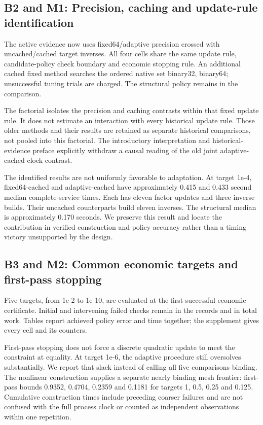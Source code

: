 \documentclass[
  11pt,
]{article}
\begin{document}
\hypertarget{b2-and-m1-precision-caching-and-update-rule-identification}{%
\subsection{B2 and M1: Precision, caching and update-rule
identification}\label{b2-and-m1-precision-caching-and-update-rule-identification}}

The active evidence now uses fixed64/adaptive precision crossed with
uncached/cached target inverses. All four cells share the same update
rule, candidate-policy check boundary and economic stopping rule. An
additional cached fixed method searches the ordered native set binary32,
binary64; unsuccessful tuning trials are charged. The structural policy
remains in the comparison.

The factorial isolates the precision and caching contrasts within that
fixed update rule. It does not estimate an interaction with every
historical update rule. Those older methods and their results are
retained as separate historical comparisons, not pooled into this
factorial. The introductory interpretation and historical-evidence
preface explicitly withdraw a causal reading of the old joint
adaptive-cached clock contrast.

The identified results are not uniformly favorable to adaptation. At
target 1e-4, fixed64-cached and adaptive-cached have approximately 0.415
and 0.433 second median complete-service times. Each has eleven factor
updates and three inverse builds. Their uncached counterparts build
eleven inverses. The structural median is approximately 0.170 seconds.
We preserve this result and locate the contribution in verified
construction and policy accuracy rather than a timing victory
unsupported by the design.

\hypertarget{b3-and-m2-common-economic-targets-and-first-pass-stopping}{%
\subsection{B3 and M2: Common economic targets and first-pass
stopping}\label{b3-and-m2-common-economic-targets-and-first-pass-stopping}}

Five targets, from 1e-2 to 1e-10, are evaluated at the first successful
economic certificate. Initial and intervening failed checks remain in
the records and in total work. Tables report achieved policy error and
time together; the supplement gives every cell and its counters.

First-pass stopping does not force a discrete quadratic update to meet
the constraint at equality. At target 1e-6, the adaptive procedure still
oversolves substantially. We report that slack instead of calling all
five comparisons binding. The nonlinear construction supplies a separate
nearly binding mesh frontier: first-pass bounds 0.9352, 0.4704, 0.2359
and 0.1181 for targets 1, 0.5, 0.25 and 0.125. Cumulative construction
times include preceding coarser failures and are not confused with the
full process clock or counted as independent observations within one
repetition.
\end{document}

